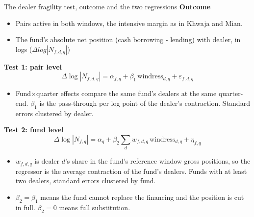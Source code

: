 \documentclass[aspectratio=169,11pt]{beamer}
\begin{document}
\begin{frame}{The dealer fragility test, outcome and the two regressions}
  \textbf{Outcome}
  \begin{itemize} \small
    \item Pairs active in both windows, the intensive margin as in Khwaja and Mian.
    \item The fund's absolute net position (cash borrowing - lending) with dealer, in logs ($\Delta log|N_{f,d,q}|$)
  \end{itemize}
  \vspace{0.4em}
  \smallskip
  \textbf{Test 1: pair level}
  \vspace{-0.4em}
  \[
    \Delta \log |N_{f,d,q}| = \alpha_{f,q} + \beta_1\, \mathrm{windress}_{d,q} + \varepsilon_{f,d,q}
  \]
  \vspace{-1.1em}
  \begin{itemize}\small
    \item Fund$\times$quarter effects compare the same fund's dealers at the same quarter-end. $\beta_1$ is the pass-through per log point of the dealer's contraction. Standard errors clustered by dealer.
  \end{itemize}
  \smallskip
  \textbf{Test 2: fund level}
  \vspace{-0.4em}
  \[
    \Delta \log |N_{f,q}| = \alpha_q + \beta_2 \sum_{d} w_{f,d,q}\, \mathrm{windress}_{d,q} + \eta_{f,q}
  \]
  \vspace{-1.1em}
  \begin{itemize}\small
    \item $w_{f,d,q}$ is dealer $d$'s share in the fund's reference window gross positions, so the regressor is the average contraction of the fund's dealers. Funds with at least two dealers, standard errors clustered by fund.
    \item $\beta_2 = \beta_1$ means the fund cannot replace the financing and the position is cut in full. $\beta_2 = 0$ means full substitution.
  \end{itemize}
\end{frame}
\end{document}
